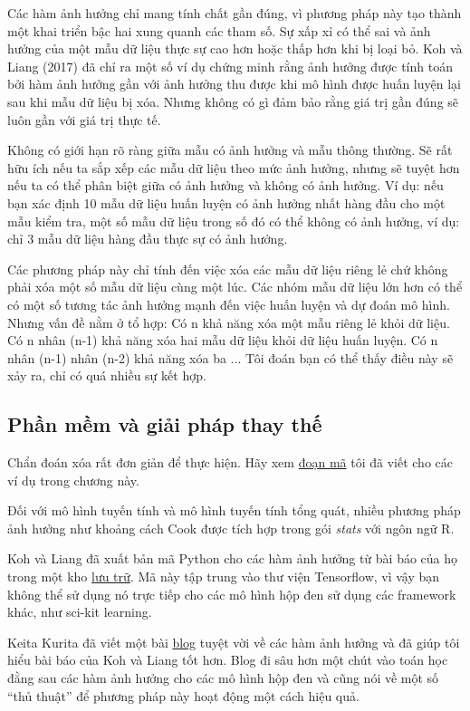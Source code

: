 Các hàm ảnh hưởng chỉ mang tính chất gần đúng, vì phương pháp này tạo thành một khai triển bậc hai xung quanh các tham số. Sự xấp xỉ có thể sai và ảnh hưởng của một mẫu dữ liệu thực sự cao hơn hoặc thấp hơn khi bị loại bỏ. Koh và Liang (2017) đã chỉ ra một số ví dụ chứng minh rằng ảnh hưởng được tính toán bởi hàm ảnh hưởng gần với ảnh hưởng thu được khi mô hình được huấn luyện lại sau khi mẫu dữ liệu bị xóa. Nhưng không có gì đảm bảo rằng giá trị gần đúng sẽ luôn gần với giá trị thực tế.

Không có giới hạn rõ ràng giữa mẫu có ảnh hưởng và mẫu thông thường. Sẽ rất hữu ích nếu ta sắp xếp các mẫu dữ liệu theo mức ảnh hưởng, nhưng sẽ tuyệt hơn nếu ta có thể phân biệt giữa có ảnh hưởng và không có ảnh hưởng. Ví dụ: nếu bạn xác định 10 mẫu dữ liệu huấn luyện có ảnh hưởng nhất hàng đầu cho một mẫu kiểm tra, một số mẫu dữ liệu trong số đó có thể không có ảnh hưởng, ví dụ: chỉ 3 mẫu dữ liệu hàng đầu thực sự có ảnh hưởng.

Các phương pháp này chỉ tính đến việc xóa các mẫu dữ liệu riêng lẻ chứ không phải xóa một số mẫu dữ liệu cùng một lúc. Các nhóm mẫu dữ liệu lớn hơn có thể có một số tương tác ảnh hưởng mạnh đến việc huấn luyện và dự đoán mô hình. Nhưng vấn đề nằm ở tổ hợp: Có n khả năng xóa một mẫu riêng lẻ khỏi dữ liệu. Có n nhân (n-1) khả năng xóa hai mẫu dữ liệu khỏi dữ liệu huấn luyện. Có n nhân (n-1) nhân (n-2) khả năng xóa ba ... Tôi đoán bạn có thể thấy điều này sẽ xảy ra, chỉ có quá nhiều sự kết hợp.

\subsection{Phần mềm và giải pháp thay thế}

Chẩn đoán xóa rất đơn giản để thực hiện. Hãy xem \href{https://github.com/christophM/interpretable-ml-book/blob/master/manuscript/06.5-example-based-influence-fct.Rmd}{đoạn mã} tôi đã viết cho các ví dụ trong chương này.

Đối với mô hình tuyến tính và mô hình tuyến tính tổng quát, nhiều phương pháp ảnh hưởng như khoảng cách Cook được tích hợp trong gói \textit{stats} với ngôn ngữ R.

Koh và Liang đã xuất bản mã Python cho các hàm ảnh hưởng từ bài báo của họ trong một kho \href{https://github.com/kohpangwei/influence-release}{lưu trữ}. Mã này tập trung vào thư viện Tensorflow, vì vậy bạn không thể sử dụng nó trực tiếp cho các mô hình hộp đen sử dụng các framework khác, như sci-kit learning.

Keita Kurita đã viết một bài \href{http://mlexplained.com/2018/06/01/paper-dissected-understanding-black-box-predictions-via-influence-functions/#more-641}{blog} tuyệt vời về các hàm ảnh hưởng và đã giúp tôi hiểu bài báo của Koh và Liang tốt hơn. Blog đi sâu hơn một chút vào toán học đằng sau các hàm ảnh hưởng cho các mô hình hộp đen và cũng nói về một số ``thủ thuật'' để phương pháp này hoạt động một cách hiệu quả.
\clearpage

